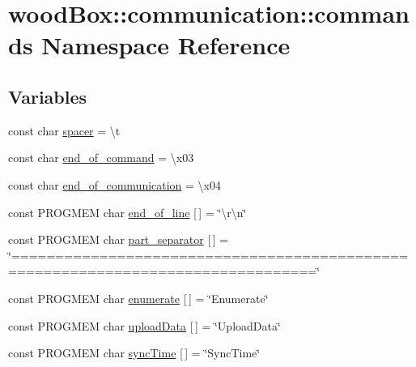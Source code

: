 \hypertarget{namespacewood_box_1_1communication_1_1commands}{}\section{wood\+Box\+:\+:communication\+:\+:commands Namespace Reference}
\label{namespacewood_box_1_1communication_1_1commands}
\subsection*{Variables}
\begin{DoxyCompactItemize}
\item 
const char \mbox{\hyperlink{namespacewood_box_1_1communication_1_1commands_abc5d93b442c40ef05fa2b59ea9876f39}{spacer}} = \textquotesingle{}\textbackslash{}t\textquotesingle{}
\item 
const char \mbox{\hyperlink{namespacewood_box_1_1communication_1_1commands_ac8f4a3315508756fb53544d3178d55c4}{end\+\_\+of\+\_\+command}} = \textquotesingle{}\textbackslash{}x03\textquotesingle{}
\item 
const char \mbox{\hyperlink{namespacewood_box_1_1communication_1_1commands_ad36c9ec2903c21271782926bb54215ed}{end\+\_\+of\+\_\+communication}} = \textquotesingle{}\textbackslash{}x04\textquotesingle{}
\item 
const P\+R\+O\+G\+M\+EM char \mbox{\hyperlink{namespacewood_box_1_1communication_1_1commands_a1ab9d7397ae2201f38fa7b5d1c5c7cfd}{end\+\_\+of\+\_\+line}} \mbox{[}$\,$\mbox{]} = \char`\"{}\textbackslash{}r\textbackslash{}n\char`\"{}
\item 
const P\+R\+O\+G\+M\+EM char \mbox{\hyperlink{namespacewood_box_1_1communication_1_1commands_a76851e1feab54d6c55c384d67bc4658d}{part\+\_\+separator}} \mbox{[}$\,$\mbox{]} = \char`\"{}================================================================================\char`\"{}
\item 
const P\+R\+O\+G\+M\+EM char \mbox{\hyperlink{namespacewood_box_1_1communication_1_1commands_a0d21bd64e9d3ac5124e4839fd7ad1674}{enumerate}} \mbox{[}$\,$\mbox{]} = \char`\"{}Enumerate\char`\"{}
\item 
const P\+R\+O\+G\+M\+EM char \mbox{\hyperlink{namespacewood_box_1_1communication_1_1commands_afe031bba1c80b536deb92aa3e53c9798}{upload\+Data}} \mbox{[}$\,$\mbox{]} = \char`\"{}Upload\+Data\char`\"{}
\item 
const P\+R\+O\+G\+M\+EM char \mbox{\hyperlink{namespacewood_box_1_1communication_1_1commands_aaaf8dba01c188b30f1da691fd505aa7b}{sync\+Time}} \mbox{[}$\,$\mbox{]} = \char`\"{}Sync\+Time\char`\"{}

\end{DoxyCompactItemize}

